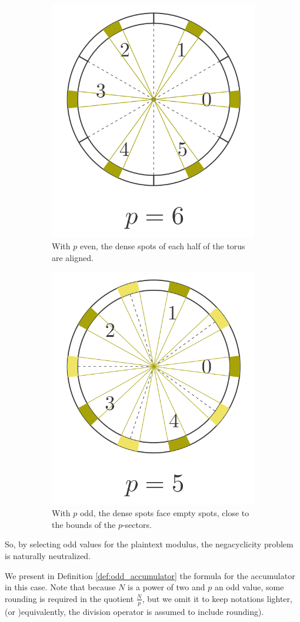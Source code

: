 \begin{figure}
	\begin{subfigure}{0.49\linewidth}
		    \centering
		\includegraphics[width=0.5\linewidth]{img/to_harmonize/torus_p_even.png}
		\caption{With $p$ even, the dense spots of each half of the torus are aligned.}
		\label{fig:torus_p_even}
	\end{subfigure}\hspace{1em}%
	\begin{subfigure}{0.49\linewidth}
		\centering
		\includegraphics[width=0.5\linewidth]{img/to_harmonize/torus_p_odd.png}
		\caption{With $p$ odd, the dense spots face empty spots, close to the bounds of the $p$-sectors.}
	\end{subfigure}
	\caption{}
	\label{fig:torus_p_even_vs_odd}
\end{figure}



So, by selecting odd values for the plaintext modulus, the negacyclicity problem is naturally neutralized.


We present in Definition \ref{def:odd_accumulator} the formula for the accumulator in this case. Note that because $N$ is a power of two and $p$ an odd value, some rounding is required in the quotient $\frac N p$, but we omit it to keep notations lighter, (or )equivalently, the division operator is assumed to include rounding).

